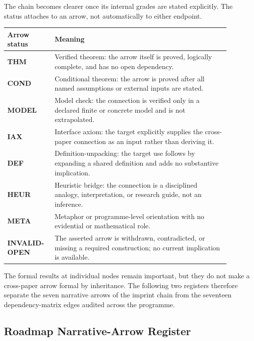\documentclass[12pt,a4paper]{article}
\begin{document}
The chain becomes clearer once its internal grades are stated explicitly.
The status attaches to an arrow, not automatically to either endpoint.

\begin{center}
\begin{tabular}{P{0.18\linewidth}P{0.72\linewidth}}
\toprule
\textbf{Arrow status} & \textbf{Meaning} \\
\midrule
\textbf{THM} & Verified theorem: the arrow itself is proved, logically complete, and has no open dependency. \\
\textbf{COND} & Conditional theorem: the arrow is proved after all named assumptions or external inputs are stated. \\
\textbf{MODEL} & Model check: the connection is verified only in a declared finite or concrete model and is not extrapolated. \\
\textbf{IAX} & Interface axiom: the target explicitly supplies the cross-paper connection as an input rather than deriving it. \\
\textbf{DEF} & Definition-unpacking: the target use follows by expanding a shared definition and adds no substantive implication. \\
\textbf{HEUR} & Heuristic bridge: the connection is a disciplined analogy, interpretation, or research guide, not an inference. \\
\textbf{META} & Metaphor or programme-level orientation with no evidential or mathematical role. \\
\textbf{INVALID-OPEN} & The asserted arrow is withdrawn, contradicted, or missing a required construction; no current implication is available. \\
\bottomrule
\end{tabular}
\end{center}

The formal results at individual nodes remain important, but they do not
make a cross-paper arrow formal by inheritance. The following two
registers therefore separate the seven narrative arrows of the imprint
chain from the seventeen dependency-matrix edges audited across the
programme.

\subsection{Roadmap Narrative-Arrow Register}
\end{document}
